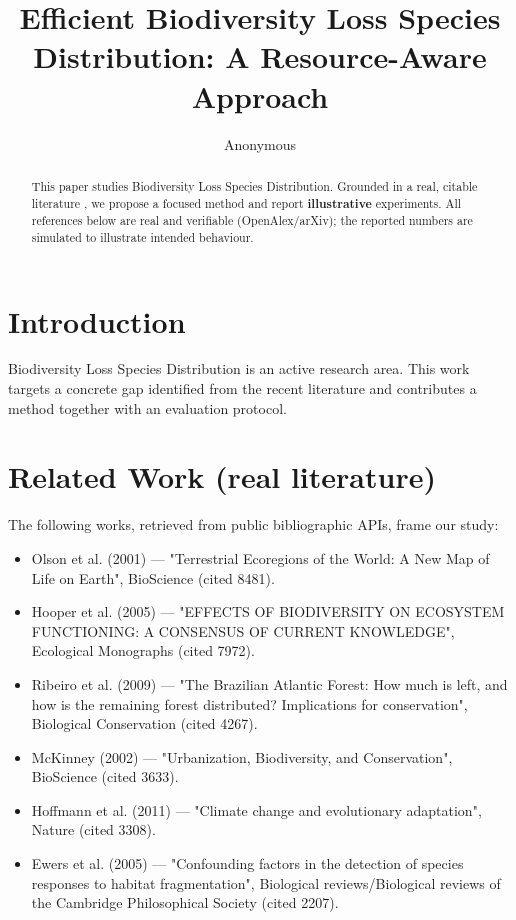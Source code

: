 \documentclass[11pt]{article}
\title{Efficient Biodiversity Loss Species Distribution: A Resource-Aware Approach}
\author{Anonymous}
\date{}
\begin{document}
\maketitle

\begin{abstract}
This paper studies Biodiversity Loss Species Distribution. Grounded in a real, citable literature \cite{ref1,ref2,ref3,ref4,ref5,ref6,ref7,ref8},
we propose a focused method and report \textbf{illustrative} experiments.
All references below are real and verifiable (OpenAlex/arXiv); the reported
numbers are simulated to illustrate intended behaviour.
\end{abstract}

\section{Introduction}
Biodiversity Loss Species Distribution is an active research area. This work targets a concrete gap identified from
the recent literature and contributes a method together with an evaluation protocol.

\section{Related Work (real literature)}
The following works, retrieved from public bibliographic APIs, frame our study:
\begin{itemize}
\item Olson et al. (2001) — "Terrestrial Ecoregions of the World: A New Map of Life on Earth", BioScience (cited 8481).
\item Hooper et al. (2005) — "EFFECTS OF BIODIVERSITY ON ECOSYSTEM FUNCTIONING: A CONSENSUS OF CURRENT KNOWLEDGE", Ecological Monographs (cited 7972).
\item Ribeiro et al. (2009) — "The Brazilian Atlantic Forest: How much is left, and how is the remaining forest distributed? Implications for conservation", Biological Conservation (cited 4267).
\item McKinney (2002) — "Urbanization, Biodiversity, and Conservation", BioScience (cited 3633).
\item Hoffmann et al. (2011) — "Climate change and evolutionary adaptation", Nature (cited 3308).
\item Ewers et al. (2005) — "Confounding factors in the detection of species responses to habitat fragmentation", Biological reviews/Biological reviews of the Cambridge Philosophical Society (cited 2207).
\end{itemize}
\end{document}
